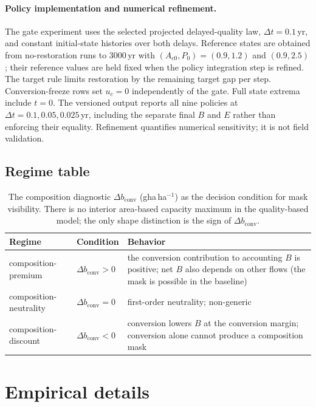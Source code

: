 \documentclass[11pt,a4paper]{article}
\newcommand{\dconv}{\Delta b_{\mathrm{conv}}}
\begin{document}
\paragraph{Policy implementation and numerical refinement.} The gate experiment uses the selected projected delayed-quality law, $\Delta t=0.1$\,yr, and constant initial-state histories over both delays. Reference states are obtained from no-restoration runs to $3000$\,yr with $(A_{c0},P_0)=(0.9,1.2)$ and $(0.9,2.5)$; their reference values are held fixed when the policy integration step is refined. The target rule limits restoration by the remaining target gap per step. Conversion-freeze rows set $u_c=0$ independently of the gate. Full state extrema include $t=0$. The versioned output reports all nine policies at $\Delta t=0.1,0.05,0.025$\,yr, including the separate final $B$ and $E$ rather than enforcing their equality. Refinement quantifies numerical sensitivity; it is not field validation.

\subsection{Regime table}\label{si:regimes}

\begin{table}[H]
\centering\small
\caption{The composition diagnostic $\dconv$ (gha\,ha$^{-1}$) as the decision condition for mask visibility. There is no interior area-based capacity maximum in the quality-based model; the only shape distinction is the sign of $\dconv$.}
\label{tab:si_regime}
\begin{tabularx}{\textwidth}{l l X}
\toprule
Regime & Condition & Behavior \\
\midrule
composition-premium & $\dconv>0$ & the conversion contribution to accounting $B$ is positive; net $B$ also depends on other flows (the mask is possible in the baseline) \\
composition-neutrality & $\dconv=0$ & first-order neutrality; non-generic \\
composition-discount & $\dconv<0$ & conversion lowers $B$ at the conversion margin; conversion alone cannot produce a composition mask \\
\bottomrule
\end{tabularx}
\end{table}

\section{Empirical details}\label{si:empirical}
\end{document}
